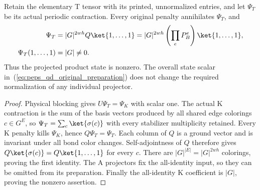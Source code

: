 \begin{theorem}
    \label{thm:peps_qd_original_preparation}
    \leanok
    Retain the elementary T tensor with its printed, unnormalized entries,
    and let $\Psi_T$ be its actual periodic contraction. Every original
    penalty annihilates $\Psi_T$, and
    \begin{align}
        \Psi_T
          &=|G|^{2wh}Q\ket{1,\ldots,1}
           =|G|^{2wh}\left(\prod_e P_B^e\right)\ket{1,\ldots,1},
        \label{eq:peps_qd_original_preparation}\\
        \Psi_T(1,\ldots,1)&=|G|\ne0.
    \end{align}
    Thus the projected product state is nonzero. The overall state scalar
    in~(\ref{eq:peps_qd_original_preparation}) does not change the required
    normalization of any individual projector.
\end{theorem}
\begin{proof}\leanok
    Physical blocking gives $U\Psi_T=\Psi_K$ with scalar one. The actual
    K contraction is the sum of the basis vectors produced by all shared
    edge colorings $c\in G^E$, so
    $\Psi_T=\sum_c\ket{\sigma(c)}$ with every stabilizer multiplicity retained.
    Every K penalty kills $\Psi_K$, hence $Q\Psi_T=\Psi_T$.
    Each column of $Q$ is a ground vector and is invariant under all bond
    color changes. Self-adjointness of $Q$ therefore gives
    $Q\ket{\sigma(c)}=Q\ket{1,\ldots,1}$ for every $c$.
    There are $|G|^{|E|}=|G|^{2wh}$ colorings, proving the first identity.
    The A projectors fix the all-identity input, so they can be omitted
    from its preparation. Finally the all-identity K coefficient is
    $|G|$, proving the nonzero assertion.
\end{proof}
